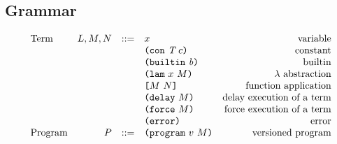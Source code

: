 %   
%   
%   



\subsection{Grammar}
\begin{minipage}{\linewidth}
    \centering
    \[\begin{array}{lrclr}
    \textrm{Term}       & L,M,N  & ::= & x                      & \textrm{variable}\\
                        &        &     & \texttt{(} \texttt{con} ~ \textit{T} ~ c \texttt{)}           & \textrm{constant}\\
                        &        &     & \texttt{(} \texttt{builtin} ~ \mathit{b} \texttt{)}            & \textrm{builtin}\\
                        &        &     & \texttt{(} \texttt{lam} ~ x ~ M  \texttt{)}            & \textrm{$\lambda$ abstraction}\\
                        &        &     & \texttt{[} M ~ N \texttt{]}            & \textrm{function application}\\
                        &        &     & \texttt{(} \texttt{delay} ~ M \texttt{)}              & \textrm{delay execution of a term}\\
                        &        &     & \texttt{(} \texttt{force} ~ M \texttt{)}              & \textrm{force execution of a term}\\
                        &        &     & \texttt{(} \texttt{error} \texttt{)}                & \textrm{error}\\
        \textrm{Program}& P      & ::= & \texttt{(} \texttt{program} ~ v ~ M \texttt{)}         & \textrm{versioned program}

    \end{array}\]
    \label{fig:untyped-grammar}
\end{minipage}



